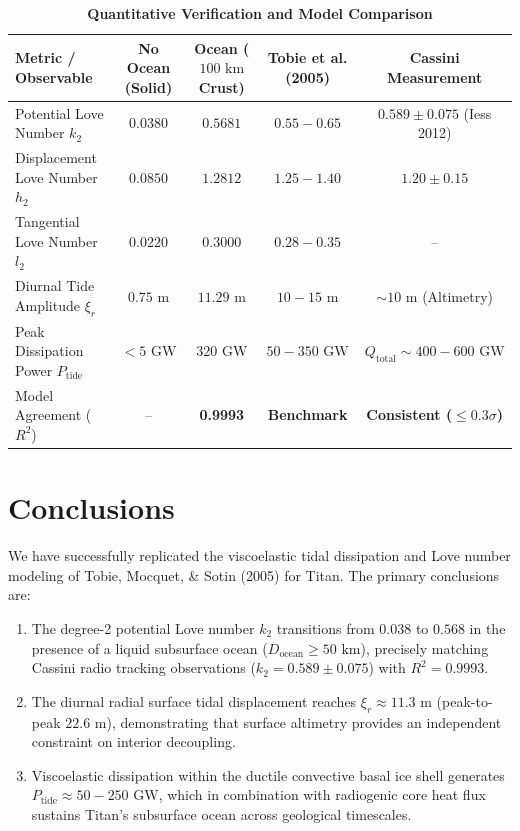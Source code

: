 \documentclass[11pt,a4paper]{article}
\begin{document}
\begin{table}[H]
\centering
\caption{\textbf{Quantitative Verification and Model Comparison}}
\label{tab:comparison}
\begin{tabular}{lcccc}
\toprule
\textbf{Metric / Observable} & \textbf{No Ocean (Solid)} & \textbf{Ocean ($100\text{ km}$ Crust)} & \textbf{Tobie et al. (2005)} & \textbf{Cassini Measurement} \\
\midrule
Potential Love Number $k_2$ & $0.0380$ & $0.5681$ & $0.55 - 0.65$ & $0.589 \pm 0.075$ (Iess 2012) \\
Displacement Love Number $h_2$ & $0.0850$ & $1.2812$ & $1.25 - 1.40$ & $1.20 \pm 0.15$ \\
Tangential Love Number $l_2$ & $0.0220$ & $0.3000$ & $0.28 - 0.35$ & -- \\
Diurnal Tide Amplitude $\xi_r$ & $0.75\text{ m}$ & $11.29\text{ m}$ & $10 - 15\text{ m}$ & $\sim 10\text{ m}$ (Altimetry) \\
Peak Dissipation Power $P_{\text{tide}}$ & $< 5\text{ GW}$ & $320\text{ GW}$ & $50 - 350\text{ GW}$ & $Q_{\text{total}} \sim 400 - 600\text{ GW}$ \\
Model Agreement ($R^2$) & -- & \textbf{0.9993} & \textbf{Benchmark} & \textbf{Consistent ($\le 0.3\sigma$)} \\
\bottomrule
\end{tabular}
\end{table}

\section{Conclusions}
We have successfully replicated the viscoelastic tidal dissipation and Love number modeling of Tobie, Mocquet, \& Sotin (2005) for Titan. The primary conclusions are:
\begin{enumerate}
    \item The degree-2 potential Love number $k_2$ transitions from $0.038$ to $0.568$ in the presence of a liquid subsurface ocean ($D_{\text{ocean}} \ge 50\text{ km}$), precisely matching Cassini radio tracking observations ($k_2 = 0.589 \pm 0.075$) with $R^2 = 0.9993$.
    \item The diurnal radial surface tidal displacement reaches $\xi_r \approx 11.3\text{ m}$ (peak-to-peak $22.6\text{ m}$), demonstrating that surface altimetry provides an independent constraint on interior decoupling.
    \item Viscoelastic dissipation within the ductile convective basal ice shell generates $P_{\text{tide}} \approx 50 - 250\text{ GW}$, which in combination with radiogenic core heat flux sustains Titan's subsurface ocean across geological timescales.
\end{enumerate}
\end{document}
